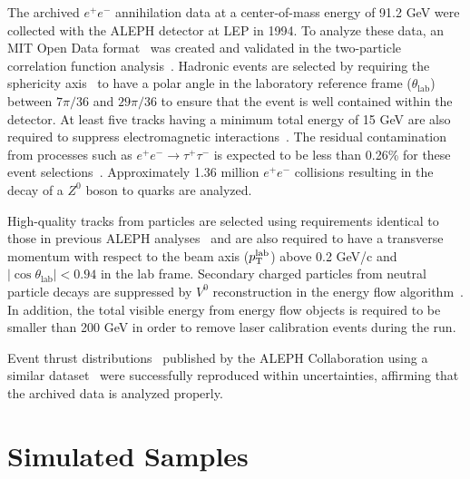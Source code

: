 \documentclass[aps,preprint,superscriptaddress,groupedaddress]{revtex4}  %
\newcommand{\pt}{$p_{\text{T}}$}
\begin{document}
The archived $e^+e^-$ annihilation data at a center-of-mass energy of 91.2 GeV were collected with the ALEPH detector at LEP in 1994. To analyze these data, an MIT Open Data format~\cite{Tripathee:2017ybi} was created and validated in  the  two-particle  correlation  function  analysis~\cite{Badea:2019vey}. Hadronic events are selected by requiring the sphericity axis~\cite{Heister:2003aj} to have a polar angle in the laboratory reference frame ($\theta_{\text{lab}}$) between $7\pi/36$ and $29\pi/36$ to ensure that the event is well contained within the detector. At least five tracks having a minimum total energy of 15 GeV are also required to suppress electromagnetic interactions~\cite{Barate:1996fi}. The residual contamination from processes such as $e^+e^-\rightarrow\tau^+\tau^-$ is expected to be less than 0.26\% for these event selections~\cite{Barate:1996fi}. Approximately 1.36 million $e^+e^-$ collisions resulting in the decay of a $Z^0$ boson to quarks are analyzed. 

High-quality tracks from particles are selected using requirements identical to those in previous ALEPH analyses~\cite{Barate:1996fi} and are also required to have a transverse momentum with respect to the beam axis ($p_{\rm T}^{\rm lab}$) above 0.2 GeV/c and $|\cos{\theta_{\text{lab}}}|<0.94$ in the lab frame. Secondary charged particles from neutral particle decays are suppressed by $V^0$ reconstruction in the energy flow algorithm~\cite{Barate:1996fi}. In addition, the total visible energy from energy flow objects is required to be smaller than 200 GeV in order to remove laser calibration events during the run.
  
Event thrust distributions~\cite{Farhi:1977sg} published by the ALEPH Collaboration using a similar dataset~\cite{Heister:2003aj} were successfully reproduced within uncertainties, affirming that the archived data is analyzed properly.  %
  
\section{\label{Section:MCSamples}Simulated Samples}
  
\end{document}
